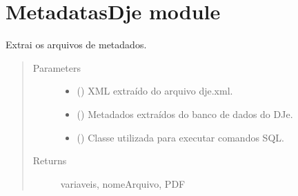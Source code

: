\documentclass[letterpaper,10pt,english]{sphinxmanual}
\begin{document}
\begin{fulllineitems}
\label{\detokenize{JobPje:JobPje.job}}
\end{fulllineitems}



\section{MetadatasDje module}
\label{\detokenize{MetadatasDje:module-MetadatasDje}}\label{\detokenize{MetadatasDje:metadatasdje-module}}\label{\detokenize{MetadatasDje::doc}}

\begin{fulllineitems}
\label{\detokenize{MetadatasDje:MetadatasDje.geraMetadatas}}
Extrai os arquivos de metadados.
\begin{quote}\begin{description}
\item[{Parameters}] \leavevmode\begin{itemize}
\item {} 
 () \textendash{} XML extraído do arquivo dje.xml.

\item {} 
 () \textendash{} Metadados extraídos do banco de dados do DJe.

\item {} 
 () \textendash{} Classe utilizada para executar comandos SQL.

\end{itemize}

\item[{Returns}] \leavevmode
variaveis, nomeArquivo, PDF

\end{description}\end{quote}

\end{fulllineitems}
\end{document}
